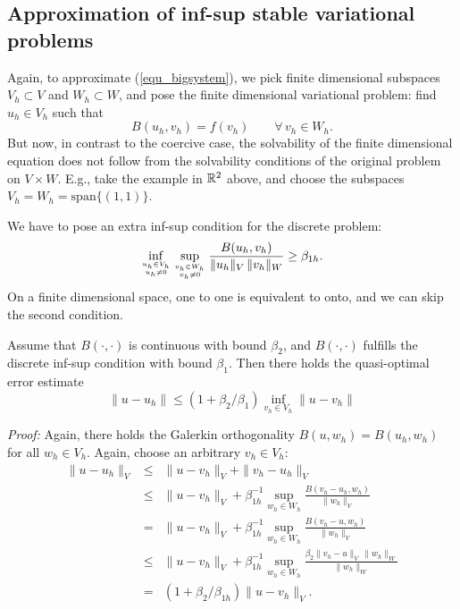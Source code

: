 \bigskip

\subsection{Approximation of inf-sup stable variational problems}
Again, to approximate (\ref{equ_bigsystem}), we pick finite dimensional
subspaces $V_h \subset V$ and $W_h \subset W$, and pose the finite dimensional
variational problem: find $u_h \in V_h$ such that
$$
B(u_h, v_h) = f(v_h) \qquad \forall \, v_h \in W_h.
$$
But now, in contrast to the coercive case, the solvability of the 
finite dimensional equation does not follow from the solvability conditions
of the original problem on $V \times W$. E.g., take the example in ${\mathbb R}^2$
above, and choose the subspaces $V_h = W_h = \mbox{span} \{ (1,1) \}$. 

We have to pose an extra inf-sup condition for the discrete problem:
\begin{equation} \label{equ_infsuph}
\inf_{u_h \in V_h \atop u_h \neq 0} \sup_{v_h \in W_h \atop v_h \neq 0}
\frac{ B(u_h,v_h) } { \| u_h \|_V \, \| v_h \|_W } \geq \beta_{1h}.
\end{equation}
On a finite dimensional space, one to one is equivalent to onto, and we
can skip the second condition.

\begin{theorem} \label{theo_approxinfsup}
Assume that $B(\cdot,\cdot)$ is continuous with bound $\beta_2$, and 
$B(\cdot,\cdot)$ fulfills the discrete inf-sup condition with bound $\beta_1$. 
Then there holds the quasi-optimal error estimate
\begin{equation}
\| u - u_h \| \leq (1 + \beta_2 / \beta_1) \inf_{v_h \in V_h} \| u - v_h \|
\end{equation}
\end{theorem}
\noindent
{\em Proof:} Again, there holds the Galerkin orthogonality $B(u,w_h) = B(u_h,w_h)$ for all $w_h \in V_h$. Again, choose an arbitrary $v_h \in V_h$:
\begin{eqnarray*}
\| u - u_h \|_V & \leq & \| u - v_h \|_V + \| v_h - u_h \|_V \\
        & \leq & \| u - v_h \|_V + \beta_{1h}^{-1} 
                \sup_{w_h \in W_h} \frac{ B(v_h-u_h, w_h) } { \| w_h \|_V } \\
        & = &  \| u - v_h \|_V + \beta_{1h}^{-1} 
                \sup_{w_h \in W_h} \frac{ B(v_h-u, w_h) } { \| w_h \|_V } \\
        & \leq & \| u - v_h \|_V + \beta_{1h}^{-1}
                \sup_{w_h \in W_h} \frac{ \beta_2 \| v_h-u \|_V \, \| w_h \|_W } { \| w_h \|_W } \\
        & = & (1 + \beta_2 / \beta_{1h}) \| u - v_h\|_V.
\end{eqnarray*}
